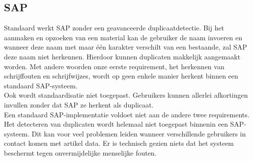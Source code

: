 \subsection{SAP}
Standaard werkt SAP zonder een geavanceerde duplicaatdetectie. Bij het aanmaken en opzoeken van een material kan de gebruiker de naam invoeren en wanneer deze naam met maar één karakter verschilt van een bestaande, zal SAP deze naam niet herkennen. Hierdoor kunnen duplicaten makkelijk aangemaakt worden. Met andere woorden onze eerste requirement, het herkennen van schrijffouten en schrijfwijzes, wordt op geen enkele manier herkent binnen een standaard SAP-systeem.
\\Ook wordt standaardisatie niet toegepast. Gebruikers kunnen allerlei afkortingen invullen zonder dat SAP ze herkent als duplicaat. 
\\Een standaard SAP-implementatie voldoet niet aan de andere twee requirements. Het detecteren van duplicaten wordt helemaal niet toegepast binnenin een SAP-systeem. Dit kan voor veel problemen leiden wanneer verschillende gebruikers in contact komen met artikel data. Er is technisch gezien niets dat het systeem beschermt tegen onvermijdelijke menselijke fouten.

